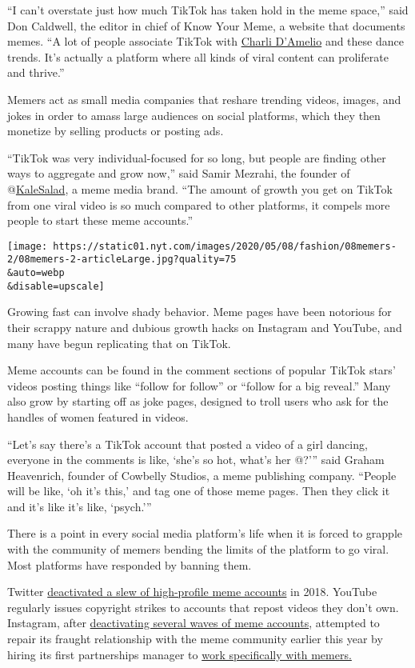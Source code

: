 ``I can't overstate just how much TikTok has taken hold in the meme
space,'' said Don Caldwell, the editor in chief of Know Your Meme, a
website that documents memes. ``A lot of people associate TikTok with
\href{https://www.nytimes.com/2020/01/03/style/hype-house-los-angeles-tik-tok.html}{Charli
D'Amelio} and these dance trends. It's actually a platform where all
kinds of viral content can proliferate and thrive.''

Memers act as small media companies that reshare trending videos,
images, and jokes in order to amass large audiences on social platforms,
which they then monetize by selling products or posting ads.

``TikTok was very individual-focused for so long, but people are finding
other ways to aggregate and grow now,'' said Samir Mezrahi, the founder
of @\href{https://www.tiktok.com/@kalesalad}{KaleSalad}, a meme media
brand. ``The amount of growth you get on TikTok from one viral video is
so much compared to other platforms, it compels more people to start
these meme accounts.''

\texttt{[image: https://static01.nyt.com/images/2020/05/08/fashion/08memers-2/08memers-2-articleLarge.jpg?quality=75\\\&auto=webp\\\&disable=upscale]}

Growing fast can involve shady behavior. Meme pages have been notorious
for their scrappy nature and dubious growth hacks on Instagram and
YouTube, and many have begun replicating that on TikTok.

Meme accounts can be found in the comment sections of popular TikTok
stars' videos posting things like ``follow for follow'' or ``follow for
a big reveal.'' Many also grow by starting off as joke pages, designed
to troll users who ask for the handles of women featured in videos.

``Let's say there's a TikTok account that posted a video of a girl
dancing, everyone in the comments is like, `she's so hot, what's her
@?''' said Graham Heavenrich, founder of Cowbelly Studios, a meme
publishing company. ``People will be like, `oh it's this,' and tag one
of those meme pages. Then they click it and it's like it's like,
`psych.'''

There is a point in every social media platform's life when it is forced
to grapple with the community of memers bending the limits of the
platform to go viral. Most platforms have responded by banning them.

Twitter
\href{https://nymag.com/intelligencer/2018/03/twitter-suspends-the-dory-girlposts-common-white-girl.html}{deactivated
a slew of high-profile meme accounts} in 2018. YouTube regularly issues
copyright strikes to accounts that repost videos they don't own.
Instagram, after
\href{https://www.insider.com/instagram-meme-page-purge-suspends-accounts-2019-7}{deactivating
several waves of meme accounts}, attempted to repair its fraught
relationship with the meme community earlier this year by hiring its
first partnerships manager to
\href{https://www.theatlantic.com/technology/archive/2019/08/instagram-hiring-meme-liaison/595552/}{work
specifically with memers.}

